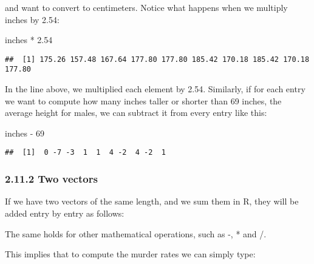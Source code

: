 \documentclass[
]{article}
\newenvironment{Shaded}{\begin{snugshade}}{\end{snugshade}}
\newcommand{\DecValTok}[1]{\textcolor[rgb]{0.00,0.00,0.81}{#1}}
\newcommand{\FloatTok}[1]{\textcolor[rgb]{0.00,0.00,0.81}{#1}}
\newcommand{\NormalTok}[1]{#1}
\newcommand{\OtherTok}[1]{\textcolor[rgb]{0.56,0.35,0.01}{#1}}
\newcommand{\SpecialCharTok}[1]{\textcolor[rgb]{0.00,0.00,0.00}{#1}}
\begin{document}
and want to convert to centimeters. Notice what happens when we multiply
inches by 2.54:

\begin{Shaded}
\begin{Highlighting}[]
\NormalTok{inches }\SpecialCharTok{*} \FloatTok{2.54}
\end{Highlighting}
\end{Shaded}

\begin{verbatim}
##  [1] 175.26 157.48 167.64 177.80 177.80 185.42 170.18 185.42 170.18 177.80
\end{verbatim}

In the line above, we multiplied each element by 2.54. Similarly, if for
each entry we want to compute how many inches taller or shorter than 69
inches, the average height for males, we can subtract it from every
entry like this:

\begin{Shaded}
\begin{Highlighting}[]
\NormalTok{inches }\SpecialCharTok{{-}} \DecValTok{69}
\end{Highlighting}
\end{Shaded}

\begin{verbatim}
##  [1]  0 -7 -3  1  1  4 -2  4 -2  1
\end{verbatim}

\hypertarget{two-vectors}{%
\subsubsection{2.11.2 Two vectors}\label{two-vectors}}

If we have two vectors of the same length, and we sum them in R, they
will be added entry by entry as follows:

The same holds for other mathematical operations, such as -, * and /.

This implies that to compute the murder rates we can simply type:

\begin{Shaded}
\end{Shaded}
\end{document}
